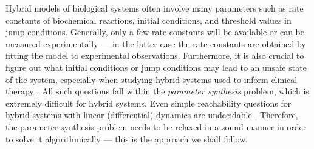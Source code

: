 Hybrid models of biological systems often involve many parameters such as rate constants of 
biochemical reactions, initial conditions, and threshold values in jump conditions. Generally, only 
a few rate constants will be available or can be measured experimentally --- in the latter case
the rate constants are obtained by fitting the model to experimental observations. Furthermore, 
it is also crucial to figure out what initial conditions or jump conditions may lead to an unsafe
state of the system, especially when studying hybrid systems used to inform clinical 
therapy \citep{tanaka10}. All such questions fall within the \textit{parameter synthesis} problem,
which is extremely difficult for hybrid systems. Even simple reachability questions for hybrid 
systems with linear (differential) dynamics are undecidable \citep{henzinger96}.
Therefore, the parameter synthesis problem needs to be relaxed in a sound manner in order to solve
it algorithmically --- this is the approach we shall follow.


